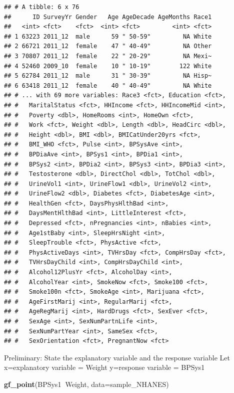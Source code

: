 \documentclass[
]{book}
\newenvironment{Shaded}{\begin{snugshade}}{\end{snugshade}}
\newcommand{\DataTypeTok}[1]{\textcolor[rgb]{0.13,0.29,0.53}{#1}}
\newcommand{\KeywordTok}[1]{\textcolor[rgb]{0.13,0.29,0.53}{\textbf{#1}}}
\newcommand{\NormalTok}[1]{#1}
\newcommand{\OperatorTok}[1]{\textcolor[rgb]{0.81,0.36,0.00}{\textbf{#1}}}
\begin{document}
\begin{verbatim}
## # A tibble: 6 x 76
##      ID SurveyYr Gender   Age AgeDecade AgeMonths Race1
##   <int> <fct>    <fct>  <int> <fct>         <int> <fct>
## 1 63223 2011_12  male      59 " 50-59"         NA White
## 2 66721 2011_12  female    47 " 40-49"         NA Other
## 3 70807 2011_12  female    22 " 20-29"         NA Mexi~
## 4 52460 2009_10  female    10 " 10-19"        122 White
## 5 62784 2011_12  male      31 " 30-39"         NA Hisp~
## 6 63418 2011_12  female    40 " 40-49"         NA White
## # ... with 69 more variables: Race3 <fct>, Education <fct>,
## #   MaritalStatus <fct>, HHIncome <fct>, HHIncomeMid <int>,
## #   Poverty <dbl>, HomeRooms <int>, HomeOwn <fct>,
## #   Work <fct>, Weight <dbl>, Length <dbl>, HeadCirc <dbl>,
## #   Height <dbl>, BMI <dbl>, BMICatUnder20yrs <fct>,
## #   BMI_WHO <fct>, Pulse <int>, BPSysAve <int>,
## #   BPDiaAve <int>, BPSys1 <int>, BPDia1 <int>,
## #   BPSys2 <int>, BPDia2 <int>, BPSys3 <int>, BPDia3 <int>,
## #   Testosterone <dbl>, DirectChol <dbl>, TotChol <dbl>,
## #   UrineVol1 <int>, UrineFlow1 <dbl>, UrineVol2 <int>,
## #   UrineFlow2 <dbl>, Diabetes <fct>, DiabetesAge <int>,
## #   HealthGen <fct>, DaysPhysHlthBad <int>,
## #   DaysMentHlthBad <int>, LittleInterest <fct>,
## #   Depressed <fct>, nPregnancies <int>, nBabies <int>,
## #   Age1stBaby <int>, SleepHrsNight <int>,
## #   SleepTrouble <fct>, PhysActive <fct>,
## #   PhysActiveDays <int>, TVHrsDay <fct>, CompHrsDay <fct>,
## #   TVHrsDayChild <int>, CompHrsDayChild <int>,
## #   Alcohol12PlusYr <fct>, AlcoholDay <int>,
## #   AlcoholYear <int>, SmokeNow <fct>, Smoke100 <fct>,
## #   Smoke100n <fct>, SmokeAge <int>, Marijuana <fct>,
## #   AgeFirstMarij <int>, RegularMarij <fct>,
## #   AgeRegMarij <int>, HardDrugs <fct>, SexEver <fct>,
## #   SexAge <int>, SexNumPartnLife <int>,
## #   SexNumPartYear <int>, SameSex <fct>,
## #   SexOrientation <fct>, PregnantNow <fct>
\end{verbatim}

Preliminary: State the explanatory variable and the response variable
Let x=explanatory variable = Weight
y=response variable = BPSys1



\begin{Shaded}
\begin{Highlighting}[]
\KeywordTok{gf_point}\NormalTok{(BPSys1}\OperatorTok{~}\NormalTok{Weight, }\DataTypeTok{data=}\NormalTok{sample_NHANES)}
\end{Highlighting}
\end{Shaded}
\end{document}
